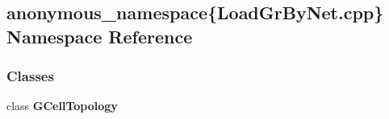 \hypertarget{namespaceanonymous__namespace_02LoadGrByNet_8cpp_03}{}\subsection{anonymous\+\_\+namespace\{Load\+Gr\+By\+Net.\+cpp\} Namespace Reference}
\label{namespaceanonymous__namespace_02LoadGrByNet_8cpp_03}
\subsubsection*{Classes}
\begin{DoxyCompactItemize}
\item 
class \textbf{ G\+Cell\+Topology}
\end{DoxyCompactItemize}
